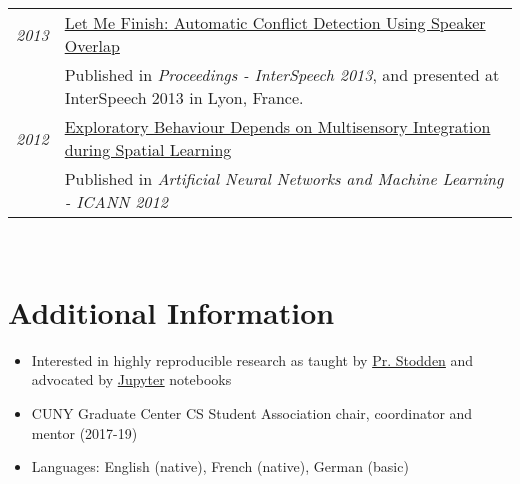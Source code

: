 \documentclass[a4paper,10pt]{article}
\begin{document}
\begin{tabular}{rp{14cm}}
        \emph{2013} & \href{https://grezesf.github.io/papers/2013-03_LetMeFinish.pdf}{Let Me Finish: Automatic Conflict Detection Using Speaker Overlap}\\
        & \small{Published in {\em Proceedings - InterSpeech 2013}, and presented at InterSpeech 2013 in Lyon, France.}
        \vspace{0.15cm} \\

        \emph{2012} & \href{https://grezesf.github.io/papers/2012-Exploratory_Behaviour_Depends_on_Multisensory_Integration_during_Spatial_Learning.pdf}{Exploratory Behaviour Depends on Multisensory Integration during Spatial Learning}\\
        & \small{Published in {\em Artificial Neural Networks and Machine Learning - ICANN 2012}}
    \end{tabular}\\

\section{Additional Information}
    \vspace{0.2cm}
    \begin{itemize}
        \item Interested in highly reproducible research as taught by \href{http://stodden.net}{Pr. Stodden} and advocated by \href{https://jupyter.org/}{Jupyter} notebooks
        \item CUNY Graduate Center CS Student Association chair, coordinator and mentor (2017-19) 
        \item Languages: English (native), French (native), German (basic) 
    \end{itemize}
\end{document}
